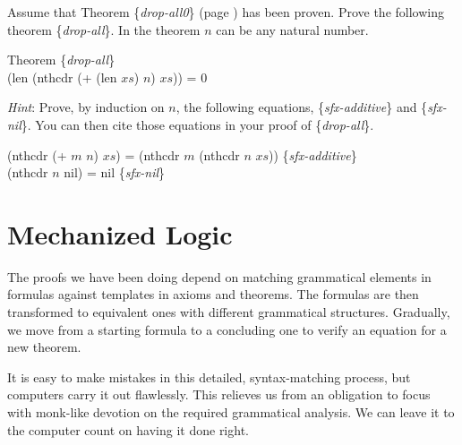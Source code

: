 \begin{ExerciseList}
\Exercise Assume that Theorem \{\emph{drop-all0}\} (page \pageref{drop-all0}) has been proven.
Prove the following theorem \{\emph{drop-all}\}.
In the theorem $n$ can be any natural number.
\begin{samepage}
\label{drop-all}
\begin{center}
Theorem \{\emph{drop-all}\} \\
(len (nthcdr (+ (len $xs$) $n$) $xs$)) = 0
\end{center}
\end{samepage}
\emph{Hint}: Prove, by induction on $n$, the following equations,
\{\emph{sfx-additive}\} and \{\emph{sfx-nil}\}.
You can then cite those equations in your proof of \{\emph{drop-all}\}.
\begin{center}
(nthcdr (+ $m$ $n$) $xs$) = (nthcdr $m$ (nthcdr $n$ $xs$)) \{\emph{sfx-additive}\} \\
(nthcdr $n$ nil) = nil \{\emph{sfx-nil}\} \\
\end{center}


\end{ExerciseList}


\section{Mechanized Logic}
\label{sec:mech-logic}
The proofs we have been doing depend on matching grammatical elements in formulas
against templates in axioms and theorems.
The formulas are then transformed to equivalent ones with different grammatical structures.
Gradually, we move from a starting formula to a concluding one to verify an equation for a new theorem.

It is easy to make mistakes in this detailed, syntax-matching process,
but computers carry it out flawlessly.
This relieves us from an obligation to focus with monk-like devotion on the required grammatical analysis.
We can leave it to the computer count on having it done right.

